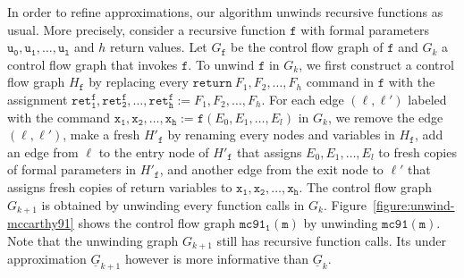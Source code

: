 In order to refine approximations, our algorithm unwinds recursive
functions as usual. More precisely, consider a recursive function
$\mathtt{f}$ with formal parameters $\mathtt{u_0}, \mathtt{u_1},
\ldots, \mathtt{u_l}$ and $h$ return values. Let $G_{\mathtt{f}}$ be
the control flow graph of $\mathtt{f}$ and $G_k$ a control flow graph
that invokes $\mathtt{f}$. To unwind $\mathtt{f}$ in $G_k$, 
we first construct a control flow graph $H_{\mathtt{f}}$ by 
replacing every $\mathtt{return}\ F_1, F_2, \ldots, F_h$ command in
$\mathtt{f}$ with the assignment $\mathtt{ret^f_1}, \mathtt{ret^f_2}, \ldots,
\mathtt{ret^f_h} := F_1, F_2, \ldots, F_h$. For each edge $(\ell,
\ell')$ labeled with the command $\mathtt{x_1}, \mathtt{x_2}, \ldots,
\mathtt{x_h} := \mathtt{f}(E_0, E_1, \ldots, E_l)$ in $G_k$, we remove
the edge $(\ell, \ell')$, make a fresh $H'_{\mathtt{f}}$ by
renaming every nodes and variables in $H_{\mathtt{f}}$, add an edge
from $\ell$ to the entry node of $H'_{\mathtt{f}}$ that assigns $E_0,
E_1, \ldots, E_l$ to fresh copies of formal parameters in
$H'_{\mathtt{f}}$, and another edge from the exit node to $\ell'$ that
assigns fresh copies of return variables to $\mathtt{x_1},
\mathtt{x_2}, \ldots, \mathtt{x_h}$. The control flow graph $G_{k+1}$
is obtained by unwinding every function calls in $G_k$. 
Figure~\ref{figure:unwind-mccarthy91} shows the control flow graph
$\mathtt{mc91_1(m)}$ by unwinding $\mathtt{mc91(m)}$. Note that the
unwinding graph $G_{k+1}$ still has recursive function calls. Its
under approximation $\underline{G}_{k+1}$ however is more informative
than $\underline{G}_k$.

